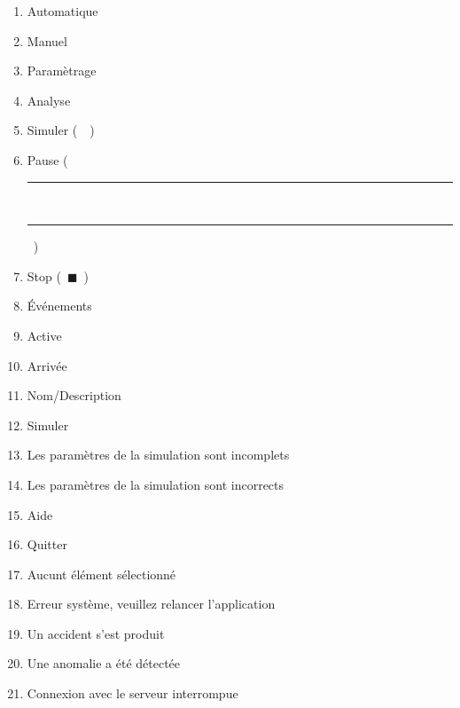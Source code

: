 \begin{enumerate}
	\item Automatique
	\item Manuel
	\item Paramètrage
	\item Analyse
	\item Simuler (~~)
	\item Pause (~\rule[-1pt]{2pt}{0.8em}~\rule[-1pt]{2pt}{0.8em}~)
	\item Stop (~$\blacksquare$~)
	\item Événements
	\item Active
	\item Arrivée
	\item Nom/Description
	\item Simuler
	\item Les paramètres de la simulation sont incomplets
	\item Les paramètres de la simulation sont incorrects
	\item Aide
	\item Quitter
	\item Aucunt élément sélectionné
	\item Erreur système, veuillez relancer l'application
	\item Un accident s'est produit
	\item Une anomalie a été détectée
	\item Connexion avec le serveur interrompue
\end{enumerate}
